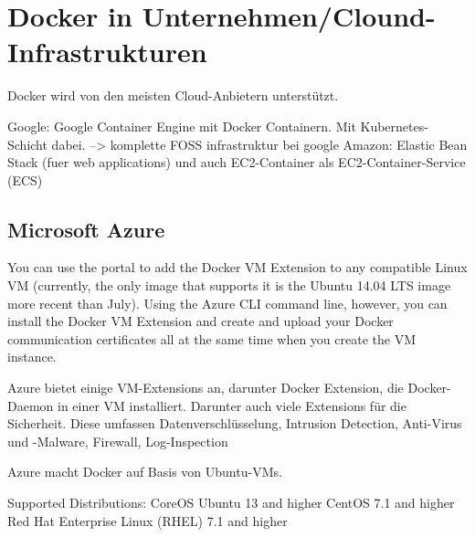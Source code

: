 \documentclass[../main.tex]{subfiles}
\begin{document}
\chapter{Docker in Unternehmen/Clound-Infrastrukturen}
\label{secInfrastructure}
  Docker wird von den meisten Cloud-Anbietern unterstützt.

  Google: Google Container Engine mit Docker Containern. Mit Kubernetes-Schicht dabei. --> komplette FOSS infrastruktur bei google
  Amazon: Elastic Bean Stack (fuer web applications) und auch EC2-Container als EC2-Container-Service (ECS)

  \section{Microsoft Azure}


    You can use the portal to add the Docker VM Extension to any compatible Linux VM (currently, the only image that supports it is the Ubuntu 14.04 LTS image more recent than July). Using the Azure CLI command line, however, you can install the Docker VM Extension and create and upload your Docker communication certificates all at the same time when you create the VM instance.
    \cite{https://azure.microsoft.com/de-de/documentation/articles/virtual-machines-docker-vm-extension/}


    Azure bietet einige VM-Extensions an, darunter Docker Extension, die Docker-Daemon in einer VM installiert.
    Darunter auch viele Extensions für die Sicherheit. Diese umfassen Datenverschlüsselung, Intrusion Detection, Anti-Virus und -Malware, Firewall, Log-Inspection
    \cite{https://azure.microsoft.com/en-us/documentation/articles/virtual-machines-extensions-features/}

    Azure macht Docker auf Basis von Ubuntu-VMs.
    \cite{http://www.infoworld.com/article/2887579/hybrid-cloud/ibm-embraces-docker-openstack-in-bluemix-hybrid-cloud-plans.html}

    Supported Distributions:
      CoreOS
      Ubuntu 13 and higher
      CentOS 7.1 and higher
      Red Hat Enterprise Linux (RHEL) 7.1 and higher
    \cite{https://github.com/Azure/azure-docker-extension}
\end{document}
